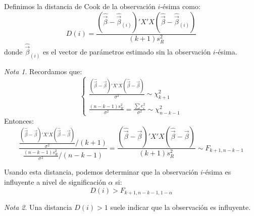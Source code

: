 \documentclass{report}
\theoremstyle{remark}
\theoremstyle{remark}
\newtheorem*{note}{Nota}
\theoremstyle{remark}
\theoremstyle{definition}
\theoremstyle{definition}
\theoremstyle{definition}
\begin{document}
Definimos la distancia de Cook de la observación $i$-ésima como:
$$D(i) = \frac{(\hat{\vec{\beta}}-\hat{\vec{\beta}}_{(i)})'X'X(\hat{\vec{\beta}}-\hat{\vec{\beta}}_{(i)})}{(k+1)s_R^2}$$
donde $\hat{\vec{\beta}}_{(i)}$ es el vector de parámetros estimado sin la observación $i$-ésima.

\begin{note}
    Recordamos que:
    $$\begin{cases}
            \frac{(\hat{\vec{\beta}}-\vec{\beta})'X'X(\hat{\vec{\beta}}-\vec{\beta})}{\sigma^2} \sim \chi^2_{k+1} \\
            \frac{(n-k-1)s_R^2}{\sigma^2} = \frac{\sum e_i^2}{\sigma^2} \sim \chi^2_{n-k-1}
        \end{cases}$$
    Entonces:
    $$\frac{\frac{(\hat{\vec{\beta}}-\vec{\beta})'X'X(\hat{\vec{\beta}}-\vec{\beta})}{\sigma^2} / (k+1)}{\frac{(n-k-1)s_R^2}{\sigma^2} / (n-k-1)} = \frac{(\hat{\vec{\beta}}-\vec{\beta})'X'X(\hat{\vec{\beta}}-\vec{\beta})}{(k+1)s_R^2} \sim F_{k+1, n-k-1}$$
\end{note}

Usando esta distancia, podemos determinar que la observación $i$-ésima es influyente a nivel de significación $\alpha$ si:
$$D(i) > F_{k+1, n-k-1, 1-\alpha}$$

\begin{note}
    Una distancia $D(i) > 1$ suele indicar que la observación es influyente.
\end{note}
\end{document}
